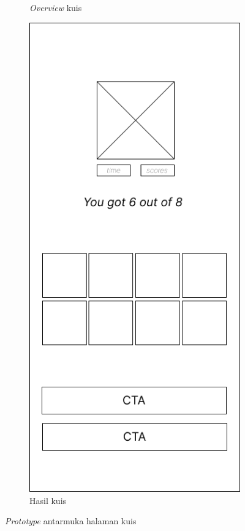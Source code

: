 \begin{figure}[H]
\begin{subfigure}[b]{0.3\textwidth}
	  \caption{\textit{Overview} kuis}
	  \label{fig:ActivityKuis2}
	\end{subfigure}
	\begin{subfigure}[b]{0.3\textwidth}
		\centering
	  \includegraphics[width=\linewidth]{contents/chapter-3/images/MF-kuis-5.png}
	  \caption{Hasil kuis}
	  \label{fig:ActivityKuis3}
	\end{subfigure}
	\caption{\textit{Prototype} antarmuka halaman kuis}
	\label{Fig:FeatureSetQuiz}
\end{figure}
